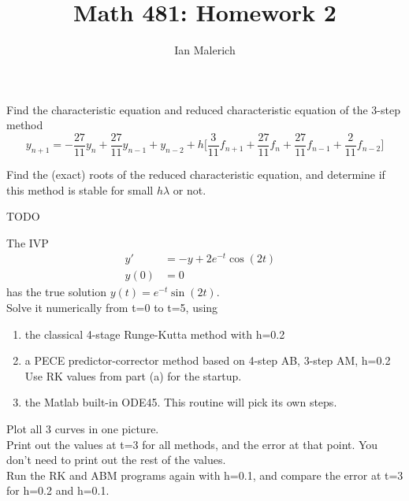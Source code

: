 \documentclass{jhwhw}
\author{Ian Malerich}
\title{Math 481: Homework 2}
\begin{document}
\problem{}

    Find the characteristic equation and reduced characteristic equation of the 3-step method
    $$
	y_{n+1} = -\frac{27}{11}y_n + \frac{27}{11}y_{n-1} + y_{n-2} + 
	h\biggr[\frac{3}{11}f_{n+1} + \frac{27}{11}f_n + \frac{27}{11}f_{n-1} + \frac{2}{11}f_{n-2}\biggr]
    $$

    Find the (exact) roots of the reduced characteristic equation, and determine if this method
    is stable for small $h\lambda$ or not.

\solution
    
    TODO

\problem{}

    The IVP
    \begin{align*}
	y' &= -y + 2e^{-t}\cos(2t) &\\
	y(0) &= 0
    \end{align*}
    has the true solution $y(t) = e^{-t}\sin(2t)$. \\
    Solve it numerically from t=0 to t=5, using
    \begin{enumerate}
	\item the classical 4-stage Runge-Kutta method with h=0.2
	\item a PECE predictor-corrector method based on 4-step AB, 3-step AM, h=0.2 \\
	    Use RK values from part (a) for the startup.
	\item the Matlab built-in ODE45. This routine will pick its own steps.
    \end{enumerate}

    Plot all 3 curves in one picture. \\
    Print out the values at t=3 for all methods, and the error at that point. You don't
    need to print out the rest of the values. \\
    Run the RK and ABM programs again with h=0.1, and compare the error at t=3 for
    h=0.2 and h=0.1.
\end{document}
